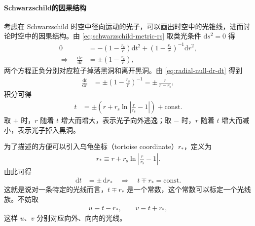 \paragraph{Schwarzschild的因果结构}
考虑在 Schwarzschild 时空中径向运动的光子，可以画出时空中的光锥线，进而讨论时空中的因果结构。由 \ref{eq:schwarzschild-metric-rs} 取类光条件 $\mathrm{d}s^{2}=0$ 得
\begin{align}
0
&=
- \left(1 - \frac{r_{\mathrm{s}}}{r}\right)\mathrm{d}t^{2}
+ \left(1 - \frac{r_{\mathrm{s}}}{r}\right)^{-1}\mathrm{d}r^{2},
\\[4pt]
\Rightarrow\quad
\frac{\mathrm{d}r}{\mathrm{d}t}
&=
\pm\left(1 - \frac{r_{\mathrm{s}}}{r}\right),
\label{eq:radial-null-dr-dt}
\end{align}
两个方程正负分别对应粒子掉落黑洞和离开黑洞。由 \ref{eq:radial-null-dr-dt} 得到
\begin{align}
\frac{\mathrm{d}t}{\mathrm{d}r}
&=
\pm\left(1 - \frac{r_{\mathrm{s}}}{r}\right)^{-1}
=
\pm\,\frac{r}{r-r_{\mathrm{s}}},
\end{align}
积分可得
\begin{align}
t
&=
\pm\left(r + r_{\mathrm{s}}\ln\left|\frac{r}{r_{\mathrm{s}}}-1\right|\right)
+ \text{const}.
\label{eq:radial-null-integrated}
\end{align}
取 $+$ 时，$r$ 随着 $t$ 增大而增大，表示光子向外逃逸；取 $-$ 时，$r$ 随着 $t$ 增大而减小，表示光子掉入黑洞。

为了描述的方便可以引入乌龟坐标（tortoise coordinate）$r_{*}$，定义为
\begin{align}
r_{*}
\equiv
r + r_{\mathrm{s}}\ln\left|\frac{r}{r_{\mathrm{s}}}-1\right|.
\label{eq:tortoise-def}
\end{align}
由此可得
\begin{align}
\mathrm{d}t
&=
\pm\,\mathrm{d}r_{*}
\quad\Rightarrow\quad
t \mp r_{*}
=
\text{const}.
\label{eq:null-lines-tortoise}
\end{align}
这就是说对一条特定的光线而言，$t \mp r_{*}$ 是一个常数，这个常数可以标定一个光线族。不妨取
\begin{align}
u
\equiv
t - r_{*},
\qquad
v
\equiv
t + r_{*},
\label{eq:null-coords-def}
\end{align}
这样 $u$、$v$ 分别对应向外、向内的光线。

